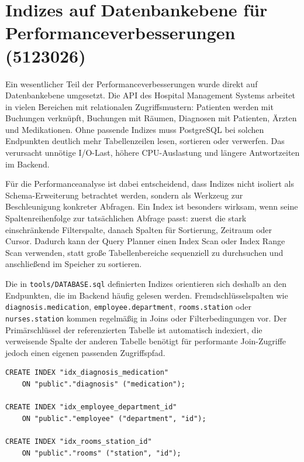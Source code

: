 \section{Indizes auf Datenbankebene für Performanceverbesserungen (5123026)}
\label{sec:datenbank_indizes}

Ein wesentlicher Teil der Performanceverbesserungen wurde direkt auf Datenbankebene umgesetzt. Die API des Hospital Management Systems arbeitet in vielen Bereichen mit relationalen Zugriffsmustern: Patienten werden mit Buchungen verknüpft, Buchungen mit Räumen, Diagnosen mit Patienten, Ärzten und Medikationen. Ohne passende Indizes muss PostgreSQL bei solchen Endpunkten deutlich mehr Tabellenzeilen lesen, sortieren oder verwerfen. Das verursacht unnötige I/O-Last, höhere CPU-Auslastung und längere Antwortzeiten im Backend.

Für die Performanceanalyse ist dabei entscheidend, dass Indizes nicht isoliert als Schema-Erweiterung betrachtet werden, sondern als Werkzeug zur Beschleunigung konkreter Abfragen. Ein Index ist besonders wirksam, wenn seine Spaltenreihenfolge zur tatsächlichen Abfrage passt: zuerst die stark einschränkende Filterspalte, danach Spalten für Sortierung, Zeitraum oder Cursor. Dadurch kann der Query Planner einen Index Scan oder Index Range Scan verwenden, statt große Tabellenbereiche sequenziell zu durchsuchen und anschließend im Speicher zu sortieren.

Die in \texttt{tools/DATABASE.sql} definierten Indizes orientieren sich deshalb an den Endpunkten, die im Backend häufig gelesen werden. Fremdschlüsselspalten wie \texttt{diagnosis.medication}, \texttt{employee.department}, \texttt{rooms.station} oder \texttt{nurses.station} kommen regelmäßig in Joins oder Filterbedingungen vor. Der Primärschlüssel der referenzierten Tabelle ist automatisch indexiert, die verweisende Spalte der anderen Tabelle benötigt für performante Join-Zugriffe jedoch einen eigenen passenden Zugriffspfad.

\begin{lstlisting}[style=sqlstyle, caption={Indizes für häufige Fremdschlüssel-Joins}]
CREATE INDEX "idx_diagnosis_medication"
    ON "public"."diagnosis" ("medication");

CREATE INDEX "idx_employee_department_id"
    ON "public"."employee" ("department", "id");

CREATE INDEX "idx_rooms_station_id"
    ON "public"."rooms" ("station", "id");
\end{lstlisting}

